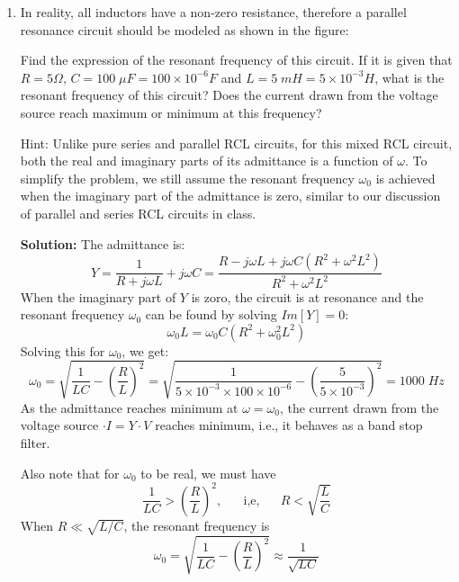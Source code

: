 \begin{enumerate}
\item In reality, all inductors have a non-zero resistance, therefore a 
parallel resonance circuit should be modeled as shown in the figure:


Find the expression of the resonant frequency of this circuit. If it is 
given that $R=5\Omega$, $C=100\;\mu F=100\times 10^{-6}F$ and $L=5\; 
mH=5\times 10^{-3}H$, what is the resonant frequency of this circuit? 
Does the current drawn from the voltage source reach maximum or minimum 
at this frequency?

Hint: Unlike pure series and parallel RCL circuits, for this mixed RCL
circuit, both the real and imaginary parts of its admittance is a function 
of $\omega$. To simplify the problem, we still assume the resonant 
frequency $\omega_0$ is achieved when the imaginary part of the admittance
is zero, similar to our discussion of parallel and series RCL circuits in 
class.

 {\bf Solution:} The admittance is:
 \[	Y=\frac{1}{R+j\omega L}+j\omega C
 	=\frac{R-j\omega L+j\omega C(R^2+\omega^2L^2)}{R^2+\omega^2L^2}
 \]
 When the imaginary part of $Y$ is zoro, the circuit is at resonance and 
 the resonant frequency $\omega_0$ can be found by solving $Im[Y]=0$:
 \[	\omega_0 L=\omega_0 C(R^2+\omega_0^2L^2)	\]
 Solving this for $\omega_0$, we get:
 \[	\omega_0=\sqrt{\frac{1}{LC}-(\frac{R}{L})^2}
 	=\sqrt{\frac{1}{5\times 10^{-3}\times 100\times 10^{-6}}
 	-(\frac{5}{5\times 10^{-3}})^2}=1000\;Hz
 	\]
 As the admittance reaches minimum at $\omega=\omega_0$, the current drawn
 from the voltage source $\cdot{I}=Y\cdot{V}$ reaches minimum, i.e., it 
 behaves as a band stop filter.
 
 Also note that for $\omega_0$ to be real, we must have
 \[	\frac{1}{LC} > (\frac{R}{L})^2, \;\;\;\;\;\;\mbox{i,e,}
 	\;\;\;\;\;\;R<\sqrt{\frac{L}{C}}	\]
 When $R \ll \sqrt{L/C}$, the resonant frequency is
 \[
 \omega_0=\sqrt{\frac{1}{LC}-(\frac{R}{L})^2}\approx \frac{1}{\sqrt{LC}}	
 \]

%
%
% 


\end{enumerate}
